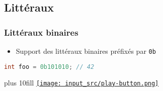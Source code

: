 \documentclass[C++.tex]{subfiles}
\begin{document}
\subsection*{Littéraux}
\begin{frame}[fragile]
	\frametitle{Littéraux binaires}
	\begin{itemize}
		\item Support des littéraux binaires préfixés par \lstinline|0b|
	\end{itemize}

	\begin{lstlisting}[language=C++]
int foo = 0b101010; // 42\end{lstlisting}

	\vskip 10mm plus 10fill
	\hfill
	\href{https://godbolt.org/#g:!((g:!((g:!((h:codeEditor,i:(filename:'1',fontScale:14,fontUsePx:'0',j:1,lang:c%2B%2B,selection:(endColumn:1,endLineNumber:9,positionColumn:1,positionLineNumber:9,selectionStartColumn:1,selectionStartLineNumber:1,startColumn:1,startLineNumber:1),source:'%23include+%3Ciostream%3E%0A%0Aint+main()%0A%7B%0A++int+foo+%3D+0b101010%3B%0A%0A++std::cout+%3C%3C+foo+%3C%3C+!'%5Cn!'%3B%0A%7D%0A'),l:'5',n:'0',o:'C%2B%2B+source+%231',t:'0')),k:50,l:'4',n:'0',o:'',s:0,t:'0'),(g:!((h:executor,i:(argsPanelShown:'1',compilationPanelShown:'0',compiler:g122,compilerName:'',compilerOutShown:'0',execArgs:'',execStdin:'',fontScale:14,fontUsePx:'0',j:1,lang:c%2B%2B,libs:!((name:boost,ver:'175')),options:'-std%3Dc%2B%2B14+-Wall+-Wextra',source:1,stdinPanelShown:'1',tree:'1',wrap:'0'),l:'5',n:'0',o:'Executor+x86-64+gcc+12.2+(C%2B%2B,+Editor+%231)',t:'0')),header:(),k:50,l:'4',n:'0',o:'',s:0,t:'0')),l:'2',n:'0',o:'',t:'0')),version:4}{\texttt{[image: input\_src/play-button.png]}}
\end{frame}
\end{document}
